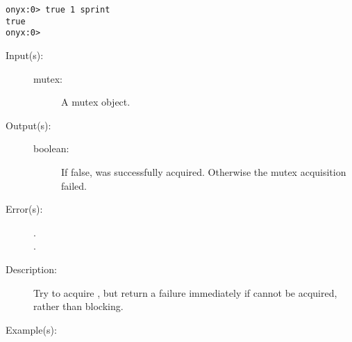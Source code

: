 \begin{description}
\begin{description}
\begin{verbatim}
onyx:0> true 1 sprint
true
onyx:0>
		\end{verbatim}
	\end{description}
\label{systemdict:trylock}
\item[{\onyxop{mutex}{trylock}{boolean}}: ]
	\begin{description}\item[]
	\item[Input(s): ]
		\begin{description}\item[]
		\item[mutex: ]
			A mutex object.
		\end{description}
	\item[Output(s): ]
		\begin{description}\item[]
		\item[boolean: ]
			If false,  was successfully acquired.
			Otherwise the mutex acquisition failed.
		\end{description}
	\item[Error(s): ]
		\begin{description}\item[]
		\item[.]
		\item[.]
		\end{description}
	\item[Description: ]
		Try to acquire , but return a failure immediately
		if  cannot be acquired, rather than blocking.
	\item[Example(s): ]\begin{verbatim}


\end{verbatim}
\end{description}
\end{description}
